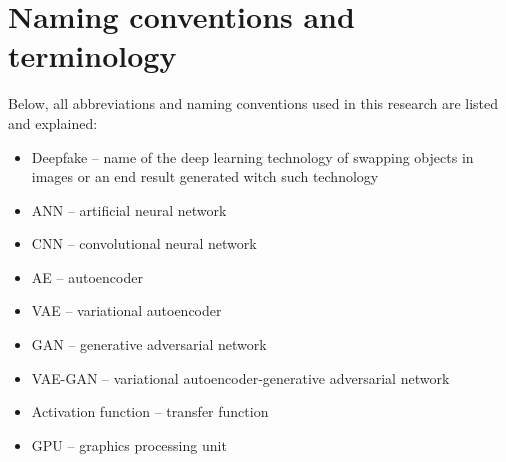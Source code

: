 \section{Naming conventions and terminology}
Below, all abbreviations and naming conventions used in this research are listed and explained:

\begin{itemize}
\item Deepfake -- name of the deep learning technology of swapping objects in images or an end result generated witch such technology
\item ANN -- artificial neural network
\item CNN -- convolutional neural network
\item AE -- autoencoder 
\item VAE -- variational autoencoder
\item GAN -- generative adversarial network
\item VAE-GAN -- variational autoencoder-generative adversarial network 
\item Activation function -- transfer function
\item GPU -- graphics processing unit
\end{itemize}